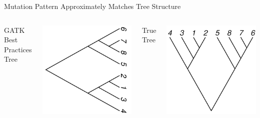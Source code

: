 \documentclass{beamer}
\begin{document}
\begin{frame}{Mutation Pattern Approximately Matches Tree Structure}
\begin{columns}
	\begin{center}
	GATK Best Practices Tree
	\end{center}
	\includegraphics[width=\linewidth]{gatk_tree_rightwards.pdf}
	\begin{center}
	True Tree
	\end{center}
	\includegraphics[width=\linewidth,angle=90]{true_tree.pdf}
\end{columns}
\end{frame}
\end{document}
